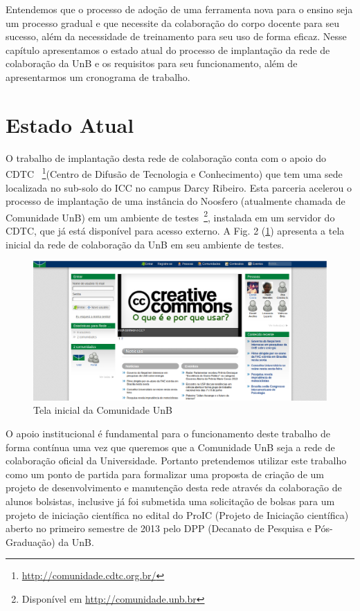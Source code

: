 Entendemos que o processo de adoção de uma ferramenta nova para o ensino seja
um processo gradual e que necessite da colaboração do corpo docente para seu
sucesso, além da necessidade de treinamento para seu uso de forma eficaz.
Nesse capítulo apresentamos o estado atual do processo de implantação da rede
de colaboração da UnB e os requisitos para seu funcionamento, além de
apresentarmos um cronograma de trabalho.


\section{Estado Atual}

O trabalho de implantação desta rede de colaboração conta com o apoio do \\ CDTC
~\footnote{\url{http://comunidade.cdtc.org.br/}}(Centro de Difusão de Tecnologia
e Conhecimento) que tem uma sede localizada no sub-solo do ICC no campus Darcy
Ribeiro. Esta parceria acelerou o processo de implantação de uma instância do
Noosfero (atualmente chamada de Comunidade UnB) em um ambiente de
testes~\footnote{Disponível em \url{http://comunidade.unb.br}}, instalada em um
servidor do CDTC, que já está disponível para acesso externo. A Fig. 2
(\ref{comunidade-unb}) apresenta a tela inicial da rede de colaboração da UnB
em seu ambiente de testes.

\begin{figure}[h]
	\centering
	\label{comunidade-unb}
		\includegraphics[keepaspectratio=true,scale=0.3]
		{figuras/comunidade.unb.br.eps}
	\caption{Tela inicial da Comunidade UnB}
\end{figure}

O apoio institucional é fundamental para o funcionamento deste trabalho de forma
contínua uma vez que queremos que a Comunidade UnB seja a rede de colaboração
oficial da Universidade. Portanto pretendemos utilizar este trabalho como um
ponto de partida para formalizar uma proposta de criação de um projeto de
desenvolvimento e manutenção desta rede através da colaboração de alunos
bolsistas, inclusive já foi submetida uma solicitação de bolsas para um projeto
de iniciação científica no edital do ProIC (Projeto de Iniciação científica)
aberto no primeiro semestre de 2013 pelo DPP (Decanato de Pesquisa e Pós-
Graduação) da UnB.

